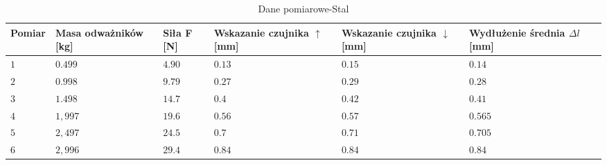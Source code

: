 \begin{table}[!h]
\centering
\begin{tabular}{|p{2cm}|p{2cm}|p{2cm}|p{2cm}|p{2cm}|p{2cm}|p{2cm}|} \hline
Pomiar & Masa odważników [kg] & Siła F [N] & Wskazanie czujnika $\uparrow$ [mm] & Wskazanie czujnika $\downarrow$ [mm] & Wydłużenie średnia $\Delta l $[mm] \\ \hline
 $1$   & $0.499$  & $4.90$ & $0.13$ & $0.15$ & $0.14$  \\ \hline
 $2$   & $0.998$  & $9.79$ & $0.27$ & $0.29$ & $0.28$  \\ \hline
 $3$   & $1.498$  & $14.7$ & $0.4$  & $0.42$ & $0.41$  \\ \hline
 $4$   & $1,997$  & $19.6$ & $0.56$ & $0.57$ & $0.565$ \\ \hline
 $5$   & $2,497$  & $24.5$ & $0.7$  & $0.71$ & $0.705$ \\ \hline
 $6$   & $2,996$  & $29.4$ & $0.84$ & $0.84$ & $0.84$  \\ \hline
\end{tabular}
\caption{Dane pomiarowe-Stal\label{tab1}}
\end{table}